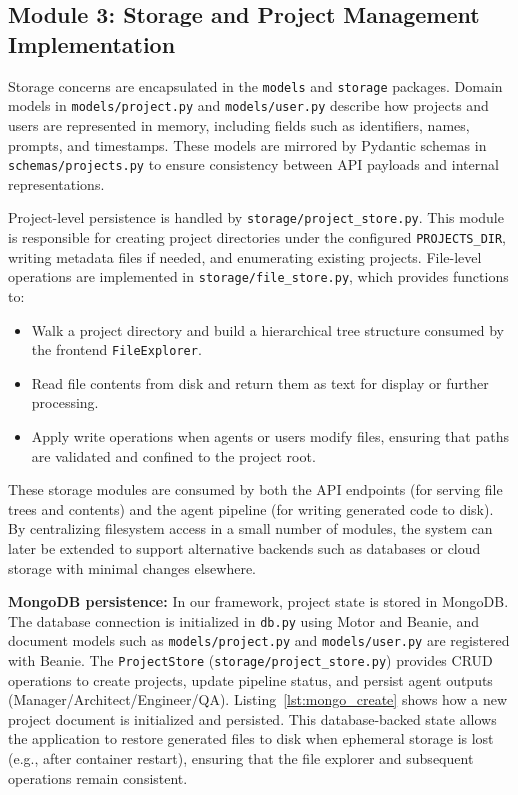 \subsection*{Module 3: Storage and Project Management Implementation}

Storage concerns are encapsulated in the \texttt{models} and \texttt{storage} packages. Domain models in \texttt{models/\allowbreak{}project.py} and \texttt{models/\allowbreak{}user.py} describe how projects and users are represented in memory, including fields such as identifiers, names, prompts, and timestamps. These models are mirrored by Pydantic schemas in \texttt{schemas/\allowbreak{}projects.py} to ensure consistency between API payloads and internal representations.

Project-level persistence is handled by \texttt{storage/\allowbreak{}project\_\allowbreak{}store.py}. This module is responsible for creating project directories under the configured \texttt{PROJECTS\_\allowbreak{}DIR}, writing metadata files if needed, and enumerating existing projects. File-level operations are implemented in \texttt{storage/\allowbreak{}file\_\allowbreak{}store.py}, which provides functions to:
\begin{itemize}
    \item Walk a project directory and build a hierarchical tree structure consumed by the frontend \texttt{FileExplorer}.
    \item Read file contents from disk and return them as text for display or further processing.
    \item Apply write operations when agents or users modify files, ensuring that paths are validated and confined to the project root.
\end{itemize}

These storage modules are consumed by both the API endpoints (for serving file trees and contents) and the agent pipeline (for writing generated code to disk). By centralizing filesystem access in a small number of modules, the system can later be extended to support alternative backends such as databases or cloud storage with minimal changes elsewhere.

\textbf{MongoDB persistence:} In our framework, project state is stored in MongoDB. The database connection is initialized in \texttt{db.py} using Motor and Beanie, and document models such as \texttt{models/\allowbreak{}project.py} and \texttt{models/\allowbreak{}user.py} are registered with Beanie. The \texttt{ProjectStore} (\texttt{storage/\allowbreak{}project\_\allowbreak{}store.py}) provides CRUD operations to create projects, update pipeline status, and persist agent outputs (Manager/Architect/Engineer/QA). Listing~\ref{lst:mongo_create} shows how a new project document is initialized and persisted. This database-backed state allows the application to restore generated files to disk when ephemeral storage is lost (e.g., after container restart), ensuring that the file explorer and subsequent operations remain consistent.

